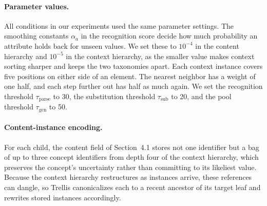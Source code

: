 \documentclass[11pt,letterpaper]{article}
\def\trellis/{{\sc Trellis}}
\begin{document}
\paragraph{Parameter values.}
All conditions in our experiments used the same parameter settings.
The smoothing constants $\alpha_a$ in the recognition score decide how
much probability an attribute holds back for unseen values. We set
these to $10^{-4}$ in the content hierarchy and $10^{-5}$ in the
context hierarchy, as the smaller value makes context sorting sharper
and keeps the two taxonomies apart. Each context instance covers five
positions on either side of an element. The nearest neighbor has a
weight of one half, and each step further out has half as much again.
We set the recognition threshold $\tau_{\text{parse}}$ to 30, the
substitution threshold $\tau_{\text{sub}}$ to 20, and the pool
threshold $\tau_{\text{gen}}$ to 50.

\paragraph{Content-instance encoding.}
For each child, the content field of Section~4.1 stores not one
identifier but a bag of up to three concept identifiers from depth four
of the context hierarchy, which preserves the concept's uncertainty
rather than committing to its likeliest value. Because the context
hierarchy restructures as instances arrive, these references can dangle,
so \trellis/ canonicalizes each to a recent ancestor of its target leaf
and rewrites stored instances accordingly.
\end{document}

